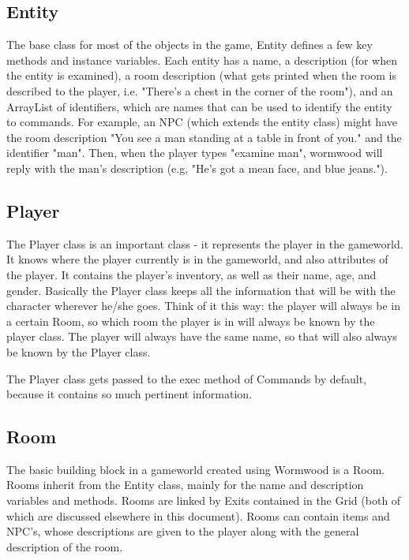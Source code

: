 \documentclass[12pt]{report}
\begin{document}
\subsection{Entity}
The base class for most of the objects in the game, Entity defines a few key methods and instance variables. Each entity has a name, a description (for when the entity is examined), a room description (what gets printed when the room is described to the player, i.e. "There's a chest in the corner of the room"), and an ArrayList of identifiers, which are names that can be used to identify the entity to commands. For example, an NPC (which extends the entity class) might have the room description "You see a man standing at a table in front of you." and the identifier "man". Then, when the player types "examine man", wormwood will reply with the man's description (e.g, "He's got a mean face, and blue jeans.").

\subsection{Player}
The Player class is an important class - it represents the player in the 
gameworld. It knows where the player currently is in the gameworld, and
also attributes of the player. It contains the player's inventory, as well
as their name, age, and gender. Basically the Player class keeps all the
information that will be with the character wherever he/she goes. Think of
it this way: the player will always be in a certain Room, so which room the
player is in will always be known by the player class. The player will always
have the same name, so that will also always be known by the Player class.

The Player class gets passed to the exec method of Commands by default,
because it contains so much pertinent information. 

\subsection{Room}
The basic building block in a gameworld created using Wormwood is a Room. Rooms inherit from the Entity class, mainly for the name and description variables and methods. Rooms are linked by Exits contained in the Grid (both of which are discussed elsewhere in this document). Rooms can contain items and NPC's, whose descriptions are given to the player along with the general description of the room.
\end{document}
